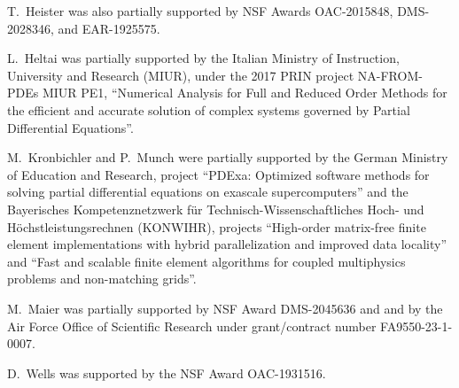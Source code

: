 \documentclass{ansarticle-preprint}
\begin{document}
T.~Heister was also partially supported by NSF
Awards OAC-2015848, DMS-2028346, and
EAR-1925575.

L.~Heltai was partially supported by the Italian Ministry of Instruction,
University and Research (MIUR), under the 2017 PRIN project NA-FROM-PDEs MIUR
PE1, ``Numerical Analysis for Full and Reduced Order Methods for the efficient
and accurate solution of complex systems governed by Partial Differential
Equations''.

M.~Kronbichler and P.~Munch were partially supported by the
German Ministry of Education and Research, project
``PDExa: Optimized software methods for solving partial differential
equations on exascale supercomputers'' and the Bayerisches Kompetenznetzwerk
f\"ur Technisch-Wissen\-schaft\-li\-ches Hoch- und H\"ochstleistungsrechnen
(KONWIHR), projects ``High-order matrix-free finite
element implementations with hybrid parallelization and improved data
locality'' and ``Fast and scalable finite element algorithms for coupled
multiphysics problems and non-matching grids''.

M.~Maier was partially supported by NSF Award DMS-2045636 and and by the
Air Force Office of Scientific Research under grant/contract number
FA9550-23-1-0007.

D.~Wells was supported by the NSF Award OAC-1931516.

{}

\end{document}
